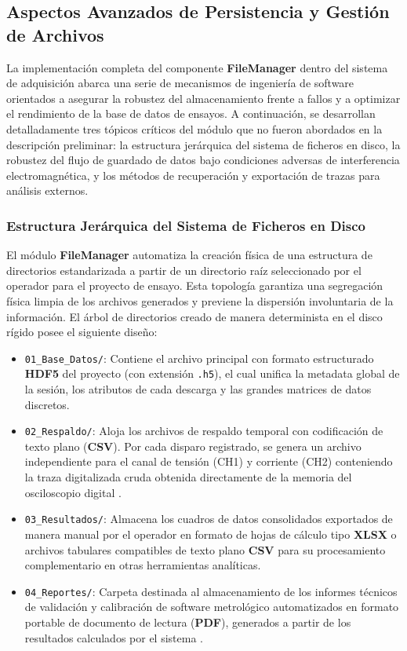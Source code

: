 \subsection{Aspectos Avanzados de Persistencia y Gestión de Archivos}
\label{subsec:aspectos_avanzados_persistencia}

La implementación completa del componente \textbf{FileManager} dentro del sistema de adquisición abarca una serie de mecanismos de ingeniería de software orientados a asegurar la robustez del almacenamiento frente a fallos y a optimizar el rendimiento de la base de datos de ensayos. A continuación, se desarrollan detalladamente tres tópicos críticos del módulo que no fueron abordados en la descripción preliminar: la estructura jerárquica del sistema de ficheros en disco, la robustez del flujo de guardado de datos bajo condiciones adversas de interferencia electromagnética, y los métodos de recuperación y exportación de trazas para análisis externos.

\subsubsection{Estructura Jerárquica del Sistema de Ficheros en Disco}
\label{subsubsec:estructura_ficheros_disco}

El módulo \textbf{FileManager} automatiza la creación física de una estructura de directorios estandarizada a partir de un directorio raíz seleccionado por el operador para el proyecto de ensayo. Esta topología garantiza una segregación física limpia de los archivos generados y previene la dispersión involuntaria de la información. El árbol de directorios creado de manera determinista en el disco rígido posee el siguiente diseño:

\begin{itemize}
    \item \texttt{01\_Base\_Datos/}: Contiene el archivo principal con formato estructurado \textbf{HDF5} del proyecto (con extensión \texttt{.h5}), el cual unifica la metadata global de la sesión, los atributos de cada descarga y las grandes matrices de datos discretos.
    \item \texttt{02\_Respaldo/}: Aloja los archivos de respaldo temporal con codificación de texto plano (\textbf{CSV}). Por cada disparo registrado, se genera un archivo independiente para el canal de tensión (CH1) y corriente (CH2) conteniendo la traza digitalizada cruda obtenida directamente de la memoria del osciloscopio digital \cite{gds1000au_ProgrammingManual}.
    \item \texttt{03\_Resultados/}: Almacena los cuadros de datos consolidados exportados de manera manual por el operador en formato de hojas de cálculo tipo \textbf{XLSX} o archivos tabulares compatibles de texto plano \textbf{CSV} para su procesamiento complementario en otras herramientas analíticas.
    \item \texttt{04\_Reportes/}: Carpeta destinada al almacenamiento de los informes técnicos de validación y calibración de software metrológico automatizados en formato portable de documento de lectura (\textbf{PDF}), generados a partir de los resultados calculados por el sistema \cite{iec61083_2}.
\end{itemize}

